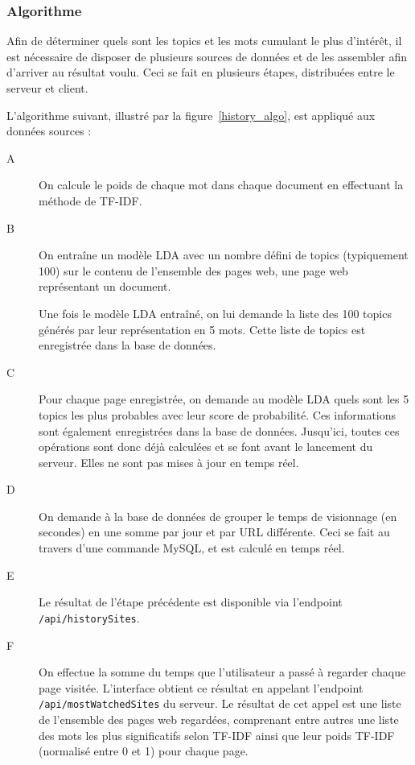 		\subsubsection{Algorithme}

			Afin de déterminer quels sont les topics et les mots cumulant le plus d'intérêt, il est nécessaire de disposer de plusieurs sources de données et de les assembler afin d'arriver au résultat voulu. Ceci se fait en plusieurs étapes, distribuées entre le serveur et client.

			L'algorithme suivant, illustré par la figure~\ref{history_algo}, est appliqué aux données sources :
			\begin{description}
				\item[A] On calcule le poids de chaque mot dans chaque document en effectuant la méthode de TF-IDF.

				\item[B] On entraîne un modèle LDA avec un nombre défini de topics (typiquement 100) sur le contenu de l'ensemble des pages web, une page web représentant un document.
				
				Une fois le modèle LDA entraîné, on lui demande la liste des 100 topics générés par leur représentation en 5 mots. Cette liste de topics est enregistrée dans la base de données.

				\item[C] Pour chaque page enregistrée, on demande au modèle LDA quels sont les 5 topics les plus probables avec leur score de probabilité. Ces informations sont également enregistrées dans la base de données. Jusqu'ici, toutes ces opérations sont donc déjà calculées et se font avant le lancement du serveur. Elles ne sont pas mises à jour en temps réel.

				\item[D] On demande à la base de données de grouper le temps de visionnage (en secondes) en une somme par jour et par URL différente. Ceci se fait au travers d'une commande MySQL, et est calculé en temps réel.

				\item[E] Le résultat de l'étape précédente est disponible via l'endpoint\\
				\texttt{/api/historySites}.

				\item[F] On effectue la somme du temps que l'utilisateur a passé à regarder chaque page visitée. L'interface obtient ce résultat en appelant l'endpoint\\
				\texttt{/api/mostWatchedSites} du serveur. Le résultat de cet appel est une liste de l'ensemble des pages web regardées, comprenant entre autres une liste des mots les plus significatifs selon TF-IDF ainsi que leur poids TF-IDF (normalisé entre 0 et 1) pour chaque page.
				

\end{description}
